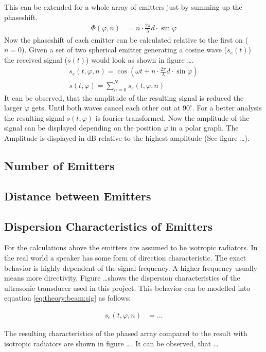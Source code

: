 %
This can be extended for a whole array of emitters just by summing up the phaseshift.
%
\begin{align}
  \Phi(\varphi, n) &= n \cdot \frac{2\pi}{\lambda} d \cdot \sin \varphi
\end{align}
%
Now the phaseshift of each emitter can be calculated relative to the first on (\(n = 0\)).\p
Given a set of two spherical emitter generating a cosine wave (\(s_e(t)\)) the received signal (\(s(t)\)) would look as shown in figure \dots.
%
\begin{align}
  s_e(t, \varphi, n) = \cos (\omega t + n \cdot \frac{2\pi}{\lambda} d \cdot \sin \varphi )\label{eq:theory:beam:sig}\\[1em]
  s(t, \varphi) = \sum_{n = 0}^{N} s_e(t, \varphi, n)
\end{align}
%
It can be observed, that the amplitude of the resulting signal is reduced the larger \(\varphi\) gets. Until both waves cancel each other out at \(90^\circ\).\p
For a better analysis the resulting signal \(s(t, \varphi)\) is fourier transformed. Now the amplitude of the signal can be displayed depending on the position \(\varphi\) in a polar graph. The Amplitude is displayed in dB relative to the highest amplitude (See figure \dots).

\subsection{Number of Emitters}

\subsection{Distance between Emitters}

\subsection{Dispersion Characteristics of Emitters}
For the calculations above the emitters are assumed to be isotropic radiators. In the real world a speaker has some form of direction characteristic. The exact behavior is highly dependent of the signal frequency. A higher frequency usually means more directivity.\p
%
Figure \dots shows the dispersion characteristics of the ultrasonic transducer used in this project. This behavior can be modelled into equation \ref{eq:theory:beam:sig} as follows:

\begin{align}
  s_e(t, \varphi, n) &= \dots
\end{align}

The resulting characteristics of the phased array compared to the result with isotropic radiators are shown in figure \dots. It can be observed, that \dots